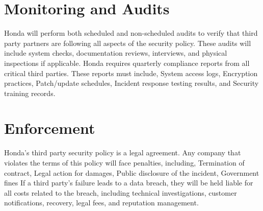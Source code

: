 \section{Monitoring and Audits}
Honda will perform both scheduled and non-scheduled audits to verify that third party partners are following all aspects of the security policy. These audits will include system checks, documentation reviews, interviews, and physical inspections if applicable. Honda requires quarterly compliance reports from all critical third parties. These reports must include, System access logs, Encryption practices, Patch/update schedules, Incident response testing results, and Security training records.

\section{Enforcement}
Honda’s third party security policy is a legal agreement. Any company that violates the terms of this policy will face penalties, including, Termination of contract, Legal action for damages, Public disclosure of the incident, Government fines
If a third party’s failure leads to a data breach, they will be held liable for all costs related to the breach, including technical investigations, customer notifications, recovery, legal fees, and reputation management.
